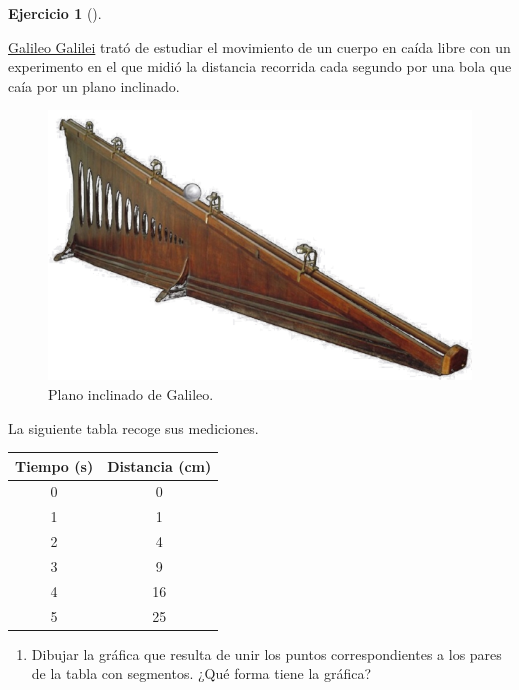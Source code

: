 \documentclass[
  a4paper,
]{scrreport}
\providecommand{\tightlist}{%
  \setlength{\itemsep}{0pt}\setlength{\parskip}{0pt}}\usepackage{longtable,booktabs,array}
\theoremstyle{definition}
\newtheorem{exercise}{Ejercicio}[chapter]
\theoremstyle{remark}
\begin{document}
\leavevmode{}%
\begin{exercise}[]\label{exr-tasa-variacion}

\href{https://en.wikipedia.org/wiki/Galileo_Galilei}{Galileo Galilei}
trató de estudiar el movimiento de un cuerpo en caída libre con un
experimento en el que midió la distancia recorrida cada segundo por una
bola que caía por un plano inclinado.

\begin{figure}

{\centering \includegraphics{./img/derivadas/plano-inclinado.png}

}

\caption{Plano inclinado de Galileo.}

\end{figure}

La siguiente tabla recoge sus mediciones.

\begin{longtable}[]{@{}cc@{}}
\toprule()
Tiempo (s) & Distancia (cm) \\
\midrule()
\endhead
0 & 0 \\
1 & 1 \\
2 & 4 \\
3 & 9 \\
4 & 16 \\
5 & 25 \\
\bottomrule()
\end{longtable}

\begin{enumerate}
\def\labelenumi{\alph{enumi}.}
\tightlist
\item
  Dibujar la gráfica que resulta de unir los puntos correspondientes a
  los pares de la tabla con segmentos. ¿Qué forma tiene la gráfica?
\end{enumerate}


\end{exercise}
\end{document}
